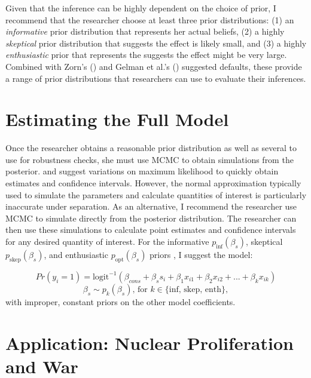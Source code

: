 \documentclass[12pt]{article}
\begin{document}
Given that the inference can be highly dependent on the choice of prior, I recommend that the researcher choose at least three prior distributions: (1) an \emph{informative} prior distribution that represents her actual beliefs, (2) a highly \emph{skeptical} prior distribution that suggests the effect is likely small, and (3) a highly \emph{enthusiastic} prior that represents the suggests the effect might be very large. Combined with Zorn's (\citeyear{Zorn2005}) and Gelman et al.'s (\citeyear{Gelmanetal2008}) suggested defaults, these provide a range of prior distributions that researchers can use to evaluate their inferences.

\section*{Estimating the Full Model}

Once the researcher obtains a reasonable prior distribution as well as several to use for robustness checks, she must use MCMC to obtain simulations from the posterior. \cite{Zorn2005} and \cite{Gelmanetal2008} suggest variations on maximum likelihood to quickly obtain estimates and confidence intervals. However, the normal approximation typically used to simulate the parameters and calculate quantities of interest \citep{KingTomzWittenberg2000} is particularly inaccurate under separation. As an alternative, I recommend the researcher use MCMC to simulate directly from the posterior distribution. The researcher can then use these simulations to calculate point estimates and confidence intervals for any desired quantity of interest. For the informative $p_{\text{inf}}(\beta_s)$, skeptical $p_{\text{skep}}(\beta_s)$, and enthusiastic $p_{\text{opt}}(\beta_s)$ priors , I suggest the model:

\begin{equation*}
Pr(y_i =1) = \text{logit}^{-1}(\beta_{cons} + \beta_s s_i +  \beta_1 x_{i1} + \beta_2 x_{i2} + ... + \beta_k x_{ik})
\end{equation*}
\begin{equation*}
\beta_s \sim  p_k(\beta_s) \text{, for } k \in \{\text{inf, skep, enth}\},
\end{equation*}
with improper, constant priors on the other model coefficients.

\section*{Application: Nuclear Proliferation and War}
\end{document}
